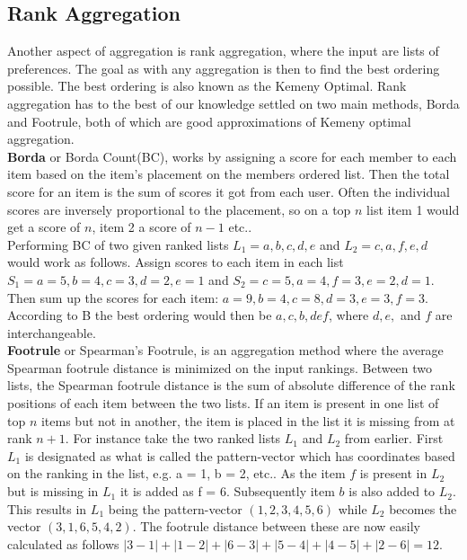 \subsection{Rank Aggregation}
Another aspect of aggregation is rank aggregation, where the input are lists of preferences. The goal as with any aggregation is then to find the best ordering possible. The best ordering is also known as the Kemeny Optimal\cite{DBLP:conf/www/DworkKNS01}.
Rank aggregation has to the best of our knowledge settled on two main methods, Borda and Footrule, both of which are good approximations of Kemeny optimal aggregation.\\

\textbf{Borda} or Borda Count(BC), works by assigning a score for each member to each item based on the item's placement on the members ordered list\cite{baltrunas}\cite{borda}. Then the total score for an item is the sum of scores it got from each user. Often the individual scores are inversely proportional to the placement, so on a top $n$ list item 1 would get a score of $n$, item 2 a score of $n-1$ etc..\\

Performing BC of two given ranked lists $L_{1} = {a,b,c,d,e}$ and $L_{2} = {c,a,f,e,d}$ would work as follows. Assign scores to each item in each list $S_{1} = {a = 5, b = 4, c = 3, d = 2, e = 1}$ and $S_{2} = {c = 5, a = 4, f = 3, e = 2, d = 1}$. Then sum up the scores for each item: $a = 9, b = 4, c = 8, d = 3, e = 3, f = 3$. According to B the best ordering would then be ${a, c, b, def}$, where $d, e,$ and $f$ are interchangeable.\\

\textbf{Footrule} or Spearman’s Footrule, is an aggregation method where the average Spearman footrule distance is minimized on the input rankings\cite{baltrunas}.
Between two lists, the Spearman footrule distance is the sum of absolute difference of the rank positions of each item between the two lists. If an item is present in one list of top $n$ items but not in another, the item is placed in the list it is missing from at rank $n + 1$.
For instance take the two ranked lists $L_{1}$ and $L_{2}$ from earlier. First $L_{1}$ is designated as what is called the pattern-vector which has coordinates based on the ranking in the list, e.g. a = 1, b = 2, etc.. As the item $f$ is present in $L_{2}$ but is missing in $L_{1}$ it is added as f = 6. Subsequently item $b$ is also added to $L_{2}$. This results in $L_{1}$ being the pattern-vector $(1,2,3,4,5,6)$ while $L_{2}$ becomes the vector $(3,1,6,5,4,2)$. The footrule distance between these are now easily calculated as follows $|3-1| + |1-2| + |6-3| + |5-4| + |4-5| + |2-6| = 12$.

